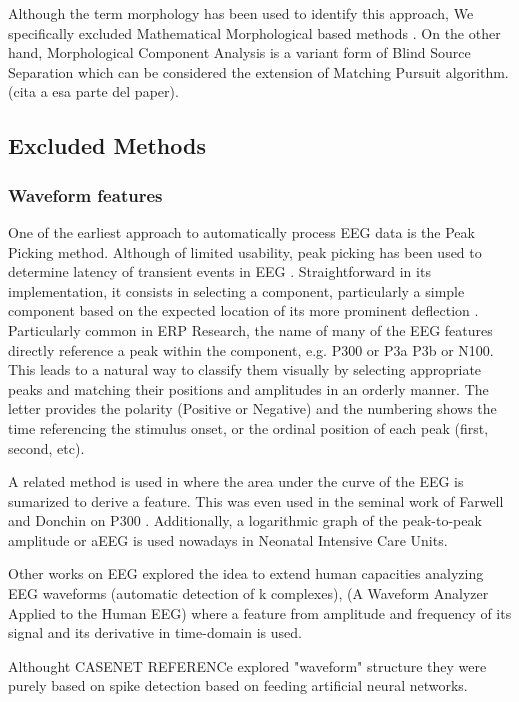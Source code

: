 \documentclass[sensors,article,submit,moreauthors,pdftex,10pt,a4paper]{mdpi}
\begin{document}
Although the term morphology has been used to identify this approach, We specifically excluded Mathematical Morphological based methods \cite{Yamaguchi2009}.  On the other hand, Morphological Component Analysis is a variant form of Blind Source Separation which can be considered the extension of Matching Pursuit algorithm. (cita a esa parte del paper).

\subsection{Excluded Methods}

\subsubsection{Waveform features}

One of the earliest approach to automatically process EEG data is the Peak Picking method.  Although of limited usability, peak picking has been used to determine latency of transient events in EEG \citep{Jaskowski2000,Zhang2011}.  Straightforward in its implementation, it consists in selecting a component, particularly a simple component based on the expected location of its more prominent deflection \citep{Ouyang2017}.  Particularly common in ERP Research, the name of many of the EEG features directly reference a peak within the component, e.g. P300 or P3a P3b or N100.  This leads to a natural way to classify them visually by selecting appropriate peaks and matching their positions and amplitudes in an orderly manner.  The letter provides the polarity (Positive or Negative) and the numbering shows the time referencing the stimulus onset, or the ordinal position of each peak (first, second, etc).   

A related method is used in \citep{Alvarado-Gonzalez2016} where the area under the curve of the EEG is sumarized to derive a feature.  This was even used in the seminal work of Farwell and Donchin on P300 \citep{Farwell1988,WolpawJonathanR2012}. Additionally, a logarithmic graph of the peak-to-peak amplitude or aEEG \citep{Shah2015} is used nowadays in Neonatal Intensive Care Units.

Other works on EEG explored the idea to extend human capacities analyzing EEG waveforms  (automatic detection of k complexes), (A Waveform Analyzer Applied to the Human EEG) where a feature from amplitude and frequency of its signal and its derivative in time-domain is used.  

Althought CASENET REFERENCe explored "waveform" structure they were purely based on spike detection based on feeding artificial neural networks.  
\end{document}
